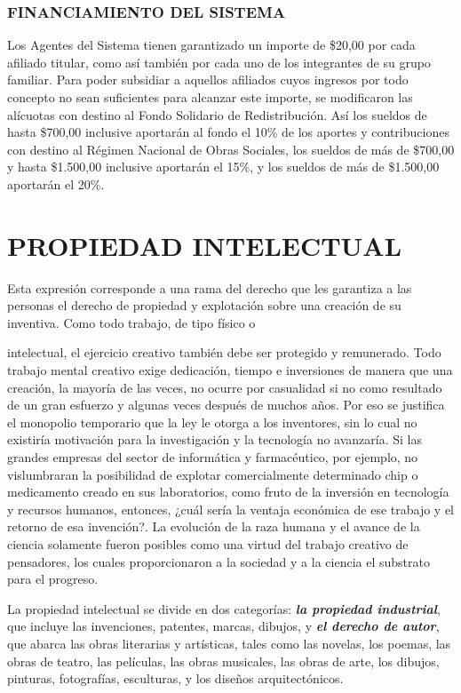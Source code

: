 \subsubsection*{FINANCIAMIENTO DEL SISTEMA}
Los Agentes del Sistema tienen garantizado un importe de \$20,00 por cada afiliado titular, como así también por cada uno de los integrantes de su grupo familiar. Para poder subsidiar a aquellos afiliados cuyos ingresos por todo concepto no sean suficientes para alcanzar este importe, se modificaron las alícuotas con destino al Fondo Solidario de Redistribución. Así los sueldos de hasta \$700,00 inclusive aportarán al fondo el 10\% de los aportes y contribuciones con destino al Régimen Nacional de Obras Sociales, los sueldos de más de \$700,00 y hasta \$1.500,00 inclusive aportarán el 15\%, y los sueldos de más de \$1.500,00 aportarán el 20\%.

\section*{PROPIEDAD INTELECTUAL}
Esta expresión corresponde a una rama del derecho que les garantiza a las personas el derecho de propiedad y explotación sobre una creación de su inventiva. Como todo trabajo, de tipo físico o



intelectual, el ejercicio creativo también debe ser protegido y remunerado. Todo trabajo mental creativo exige dedicación, tiempo e inversiones de manera que una creación, la mayoría de las veces, no ocurre por casualidad si no como resultado de un gran esfuerzo y algunas veces después de muchos años. Por eso se justifica el monopolio temporario que la ley le otorga a los inventores, sin lo cual no existiría motivación para la investigación y la tecnología no avanzaría. Si las grandes empresas del sector de informática y farmacéutico, por ejemplo, no vislumbraran la posibilidad de explotar comercialmente determinado chip o medicamento creado en sus laboratorios, como fruto de la inversión en tecnología y recursos humanos, entonces, ¿cuál sería la ventaja económica de ese trabajo y el retorno de esa invención?. La evolución de la raza humana y el avance de la ciencia solamente fueron posibles como una virtud del trabajo creativo de pensadores, los cuales proporcionaron a la sociedad y a la ciencia el substrato para el progreso.

La propiedad intelectual se divide en dos categorías: \textbf{\textit{la propiedad industrial}}, que incluye las invenciones, patentes, marcas, dibujos, y \textbf{\textit{el derecho de autor}}, que abarca las obras literarias y artísticas, tales como las novelas, los poemas, las obras de teatro, las películas, las obras musicales, las obras de arte, los dibujos, pinturas, fotografías, esculturas, y los diseños arquitectónicos.

